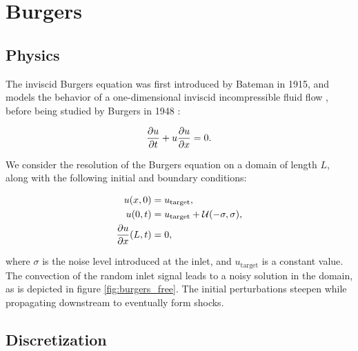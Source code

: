 \chapter{Burgers}

\section{Physics}

The inviscid Burgers equation was first introduced by Bateman in 1915, and models the behavior of a one-dimensional inviscid incompressible fluid flow \cite{bateman1915}, before being studied by Burgers in 1948 \cite{burgers1948}:

\begin{equation}
\label{eq:burgers}
	\frac{\partial u}{\partial t} + u \frac{\partial u}{\partial x} = 0.
\end{equation}

We consider the resolution of the Burgers equation on a domain of length $L$, along with the following initial and boundary conditions:

\begin{equation}
\label{eq:burgers_bc}
\begin{split}
	u(x,0)	&= u_\text{target}, \\
	u(0,t) 	&= u_\text{target} + \mathcal{U} ( -\sigma, \sigma), \\
	\frac{\partial u}{\partial x} (L,t) &= 0,
\end{split}
\end{equation}

where $\sigma$ is the noise level introduced at the inlet, and $u_\text{target}$ is a constant value. The convection of the random inlet signal leads to a noisy solution in the domain, as is depicted in figure \ref{fig:burgers_free}. The initial perturbations steepen while propagating downstream to eventually form shocks.



\section{Discretization}

